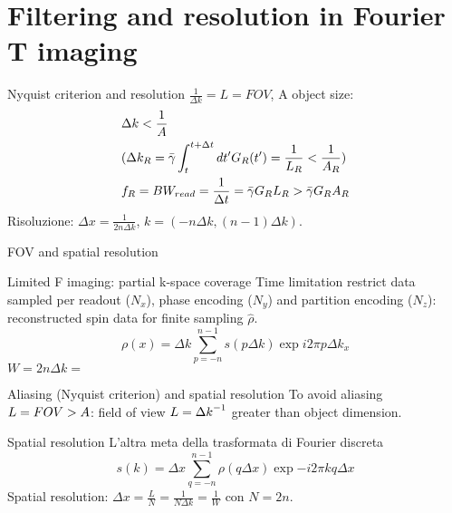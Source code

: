 \section{Filtering and resolution in Fourier T imaging}

\begin{frame}{Nyquist criterion and resolution}
$\frac{1}{\Delta k}=L=FOV$, A object size:
\begin{align*}
&\Delta k<\frac{1}{A}\\
&(\Delta k_R=\gammabar\int_t^{t+\Delta t}d t'G_R(t')=\frac{1}{L_R}<\frac{1}{A_R})\\
&f_R=BW_{read}=\frac{1}{\Delta t}=\gammabar G_RL_R>\gammabar G_RA_R
\end{align*}
Risoluzione: $\Delta x=\frac{1}{2n\Delta k}$, $k=(-n\Delta k,(n-1)\Delta k)$.
\end{frame}

\begin{frame}{FOV and spatial resolution}
    \begin{block}{Limited F imaging: partial k-space coverage}
    Time limitation restrict data sampled per readout ($N_x$), phase encoding ($N_y$) and partition encoding ($N_z$): reconstructed spin data for finite sampling $\hat{\rho}$.
    \begin{equation*}
        \rho(x)=\Delta k\sum_{p=-n}^{n-1}s(p\Delta k)\exp{i2\pi p\Delta k_x}
    \end{equation*}
    $W=2n\Delta k=$
    \end{block}
    \begin{block}{Aliasing (Nyquist criterion) and spatial resolution}
    To avoid aliasing $L=FOV{}>A$: field of view $L={\Delta k}^{-1}$ greater than object dimension.
    \end{block}
\begin{block}{Spatial resolution}
L'altra meta della trasformata di Fourier discreta
\begin{equation*}
s(k)=\Delta x\sum_{q=-n}^{n-1}\rho(q\Delta x)\exp{-i2\pi kq\Delta x}
\end{equation*}
Spatial resolution: $\Delta x=\frac{L}{N}=\frac{1}{N\Delta k}=\frac{1}{W}$ con $N=2n$.
\end{block}
\end{frame}

